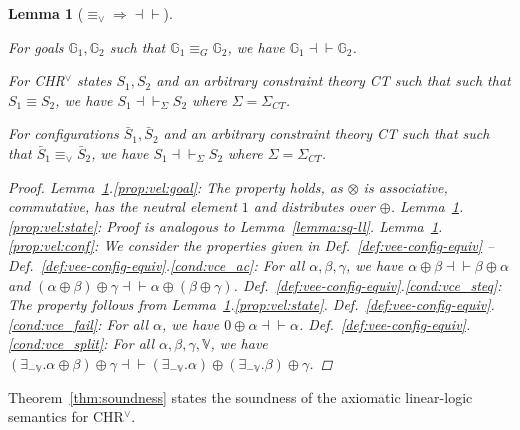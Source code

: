 \documentclass[acmtocl]{acmtrans2m}
\newtheorem{lemma}[theorem]{Lemma}
\newcommand\equv{\equiv_\vee}
\newcommand{\V}{\ensuremath{\mathbb{V}}}
\newcommand{\G}{\ensuremath{\mathbb{G}}}
\newcommand{\Sct}{\ensuremath{\Sigma_{CT}}}
\newcommand{\bS}{\bar{S}}
\begin{document}
\begin{lemma}[$\equv\Rightarrow\dashv\vdash$]
\label{lemma:vee-ce-ll}
\begin{longenum}
 \item \label{prop:vel:goal} For goals $\G_1,\G_2$ such that $\G_1\equiv_G\G_2$,
 we have $\G_1 \dashv\vdash \G_2$.
 \item \label{prop:vel:state} For CHR$^\vee$ states $S_1,S_2$ and an arbitrary
 constraint theory CT such that such that $S_1\equiv S_2$,
 we have $S_1 \dashv\vdash_\Sigma S_2$ where $\Sigma=\Sct$.
 \item \label{prop:vel:conf} For configurations $\bS_1,\bS_2$ and an arbitrary
 constraint theory CT such that such that $\bS_1\equv \bS_2$, we have $S_1
 \dashv\vdash_\Sigma S_2$ where $\Sigma=\Sct$.
\end{longenum}
\begin{proof}
  Lemma~\ref{lemma:vee-ce-ll}.\ref{prop:vel:goal}: The property holds,
  as $\otimes$ is associative, commutative, has the neutral element $1$ and
  distributes over $\oplus$.
  Lemma~\ref{lemma:vee-ce-ll}.\ref{prop:vel:state}: Proof is analogous
  to Lemma~\ref{lemma:sq-ll}.
  Lemma~\ref{lemma:vee-ce-ll}.\ref{prop:vel:conf}: We consider the properties
  given in Def.~\ref{def:vee-config-equiv} --
	Def.~\ref{def:vee-config-equiv}.\ref{cond:vce_ac}: For all $\alpha,\beta,\gamma$,
	we have $\alpha\oplus\beta\dashv\vdash\beta\oplus\alpha$ and
	$(\alpha\oplus\beta)\oplus\gamma\dashv\vdash\alpha\oplus(\beta\oplus\gamma)$.
	Def.~\ref{def:vee-config-equiv}.\ref{cond:vce_steq}: The property follows from Lemma~\ref{lemma:vee-ce-ll}.\ref{prop:vel:state}.
	Def.~\ref{def:vee-config-equiv}.\ref{cond:vce_fail}: For all $\alpha$, we have $0\oplus\alpha\dashv\vdash\alpha$.
	Def.~\ref{def:vee-config-equiv}.\ref{cond:vce_split}: For all $\alpha,\beta,\gamma,\V$, we have $(\exists_{-\V}.\alpha\oplus\beta)\oplus\gamma\dashv\vdash(\exists_{-\V}.\alpha)\oplus(\exists_{-\V}.\beta)\oplus\gamma$.
\end{proof}

\end{lemma}

Theorem~\ref{thm:soundness} states the soundness of the axiomatic linear-logic
semantics for CHR$^\vee$.
\end{document}
